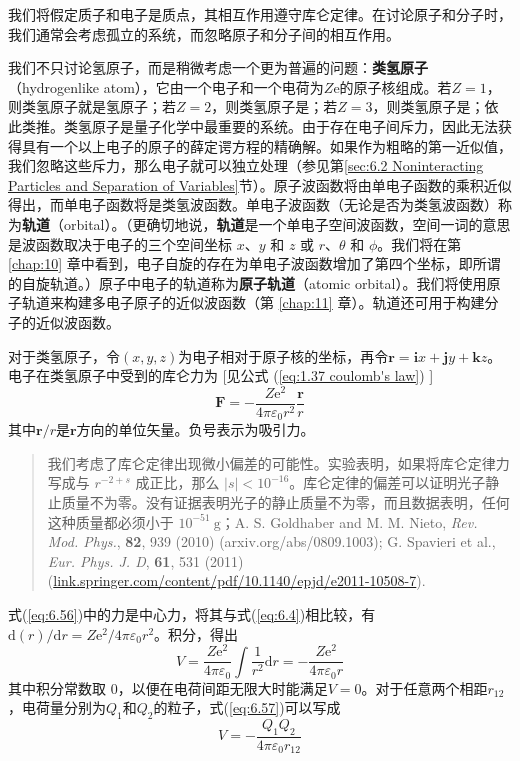     我们将假定质子和电子是质点，其相互作用遵守库仑定律。在讨论原子和分子时，我们通常会考虑孤立的系统，而忽略原子和分子间的相互作用。

    我们不只讨论氢原子，而是稍微考虑一个更为普遍的问题：\textbf{类氢原子}（hydrogenlike atom），它由一个电子和一个电荷为$Z\mathrm{e}$的原子核组成。若$Z=1$，则类氢原子就是氢原子；若$Z=2$，则类氢原子是；若$Z=3$，则类氢原子是；依此类推。类氢原子是量子化学中最重要的系统。由于存在电子间斥力，因此无法获得具有一个以上电子的原子的薛定谔方程的精确解。如果作为粗略的第一近似值，我们忽略这些斥力，那么电子就可以独立处理（参见第\ref{sec:6.2 Noninteracting Particles and Separation of Variables}节）。原子波函数将由单电子函数的乘积近似得出，而单电子函数将是类氢波函数。单电子波函数（无论是否为类氢波函数）称为\textbf{轨道}（orbital）。（更确切地说，\textbf{轨道}是一个单电子空间波函数，空间一词的意思是波函数取决于电子的三个空间坐标 $x$、$y$ 和 $z$ 或 $r$、$\theta$ 和 $\phi$。我们将在第 \ref{chap:10} 章中看到，电子自旋的存在为单电子波函数增加了第四个坐标，即所谓的自旋轨道。）原子中电子的轨道称为\textbf{原子轨道}（atomic orbital）。我们将使用原子轨道来构建多电子原子的近似波函数（第 \ref{chap:11} 章）。轨道还可用于构建分子的近似波函数。

    对于类氢原子，令$\left(x,y,z\right)$为电子相对于原子核的坐标，再令$\mathbf{r} = \mathbf{i}x+\mathbf{j}y+\mathbf{k}z$。电子在类氢原子中受到的库仑力为 [见公式 (\ref{eq:1.37 coulomb's law}) ]
    \begin{equation}
        \mathbf{F} = -\frac{Z\mathrm{e}^2}{4\pi\varepsilon_0r^2}\frac{\mathbf{r}}{r}
        \label{eq:6.56}
    \end{equation}
    其中$\mathbf{r}/r$是$\mathbf{r}$方向的单位矢量。负号表示为吸引力。

    \begin{quote}
        \small
        我们考虑了库仑定律出现微小偏差的可能性。实验表明，如果将库仑定律力写成与 $r^{-2+s}$ 成正比，那么 $\left|s\right|<10^{-16}$。库仑定律的偏差可以证明光子静止质量不为零。没有证据表明光子的静止质量不为零，而且数据表明，任何这种质量都必须小于 $10^{-51} \: \mathrm{g}$；A. S. Goldhaber and M. M. Nieto, \textit{Rev. Mod. Phys.}, \textbf{82}, 939 (2010) (arxiv.org/abs/0809.1003); G. Spavieri et al., \textit{Eur. Phys. J. D}, \textbf{61}, 531 (2011) (\url{link.springer.com/content/pdf/10.1140/epjd/e2011-10508-7}).
    \end{quote}

    式(\ref{eq:6.56})中的力是中心力，将其与式(\ref{eq:6.4})相比较，有$\mathrm{d}\left(r\right)/\mathrm{d}r = Z\mathrm{e}^2/4\pi\varepsilon_0r^2$。积分，得出
    \begin{equation}
        V = \frac{Z\mathrm{e}^2}{4\pi\varepsilon_0}\int\frac{1}{r^2}\mathrm{d}r = -\frac{Z\mathrm{e}^2}{4\pi\varepsilon_0r}
        \label{eq:6.57}
    \end{equation}
    其中积分常数取 0，以便在电荷间距无限大时能满足$V=0$。对于任意两个相距$r_{12}$，电荷量分别为$Q_1$和$Q_2$的粒子，式(\ref{eq:6.57})可以写成
    \begin{equation}
        \boxed{
            V = -\frac{Q_1Q_2}{4\pi\varepsilon_0r_{12}}
        }
        \label{eq:6.58}
    \end{equation}

